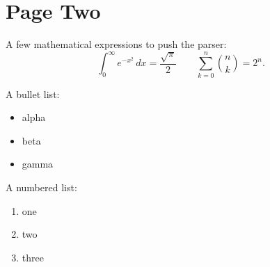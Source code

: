 \documentclass[12pt]{article}
\begin{document}
\newpage

\section{Page Two}

A few mathematical expressions to push the parser:
$$ \int_0^\infty e^{-x^2}\,dx = \frac{\sqrt{\pi}}{2}\qquad
   \sum_{k=0}^{n} \binom{n}{k} = 2^n. $$

A bullet list:
\begin{itemize}
\item alpha
\item beta
\item gamma
\end{itemize}

A numbered list:
\begin{enumerate}
\item one
\item two
\item three
\end{enumerate}
\end{document}
